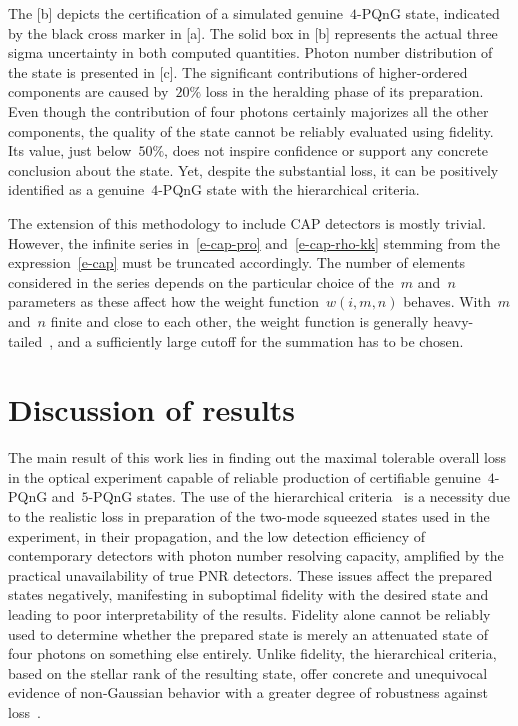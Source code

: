 \documentclass{article}
\begin{document}
The [b] depicts the certification of a simulated genuine~$4$-PQnG state, indicated by the black cross marker in [a]. The solid box in [b] represents the actual three sigma uncertainty in both computed quantities. Photon number distribution of the state is presented in [c]. The significant contributions of higher-ordered components are caused by~$20\%$ loss in the heralding phase of its preparation. Even though the contribution of four photons certainly majorizes all the other components, the quality of the state cannot be reliably evaluated using fidelity. Its value, just below~$50\%$, does not inspire confidence or support any concrete conclusion about the state. Yet, despite the substantial loss, it can be positively identified as a genuine~$4$-PQnG state with the hierarchical criteria. 

The extension of this methodology to include CAP detectors is mostly trivial. However, the infinite series in~\eqref{e-cap-pro} and~\eqref{e-cap-rho-kk} stemming from the expression~\eqref{e-cap} must be truncated accordingly. The number of elements considered in the series depends on the particular choice of the~$m$ and~$n$ parameters as these affect how the weight function~${w(i, m, n)}$ behaves. With~$m$ and~$n$ finite and close to each other, the weight function is generally heavy-tailed~\cite{provaznik2020}, and a sufficiently large cutoff for the summation has to be chosen.

%

\FloatBarrier
\section{Discussion of results}

The main result of this work lies in finding out the maximal tolerable overall loss in the optical experiment capable of reliable production of certifiable genuine~$4$-PQnG and~$5$-PQnG states. The use of the hierarchical criteria~\cite{lachman2019} is a necessity due to the realistic loss in preparation of the two-mode squeezed states used in the experiment, in their propagation, and the low detection efficiency of contemporary detectors with photon number resolving capacity, amplified by the practical unavailability of true PNR detectors. These issues affect the prepared states negatively, manifesting in suboptimal fidelity with the desired state and leading to poor interpretability of the results. Fidelity alone cannot be reliably used to determine whether the prepared state is merely an attenuated state of four photons on something else entirely. Unlike fidelity, the hierarchical criteria, based on the stellar rank of the resulting state, offer concrete and unequivocal evidence of non-Gaussian behavior with a greater degree of robustness against loss~\cite{lachman2019}.
\end{document}
